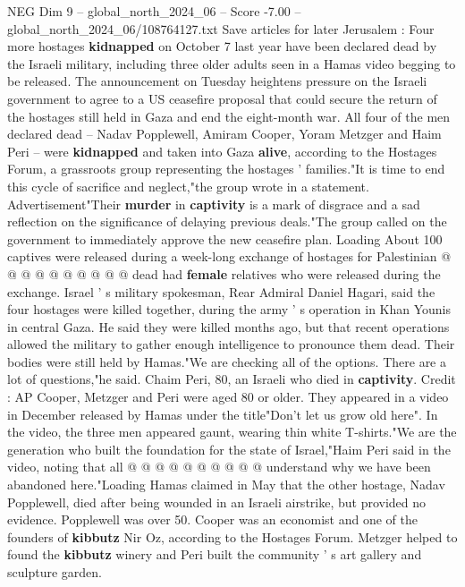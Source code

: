 \begin{textsample}{NEG Dim 9 – global\_north\_2024\_06 – Score -7.00 – global\_north\_2024\_06/108764127.txt}  \label{ex:f9_neg_166}
Save articles for later Jerusalem : Four more hostages \textbf{kidnapped} on October 7 last year have been declared dead by the Israeli military, including three older adults seen in a Hamas video begging to be released.
The announcement on Tuesday heightens pressure on the Israeli government to agree to a US ceasefire proposal that could secure the return of the hostages still held in Gaza and end the eight-month war.
All four of the men declared dead -- Nadav Popplewell, Amiram Cooper, Yoram Metzger and Haim Peri -- were \textbf{kidnapped} and taken into Gaza \textbf{alive}, according to the Hostages Forum, a grassroots group representing the hostages ' families."It is time to end this cycle of sacrifice and neglect,"the group wrote in a statement.
Advertisement"Their \textbf{murder} in \textbf{captivity} is a mark of disgrace and a sad reflection on the significance of delaying previous deals."The group called on the government to immediately approve the new ceasefire plan.
Loading About 100 captives were released during a week-long exchange of hostages for Palestinian @ @ @ @ @ @ @ @ @ @ dead had \textbf{female} relatives who were released during the exchange.
Israel ' s military spokesman, Rear Admiral Daniel Hagari, said the four hostages were killed together, during the army ' s operation in Khan Younis in central Gaza.
He said they were killed months ago, but that recent operations allowed the military to gather enough intelligence to pronounce them dead.
Their bodies were still held by Hamas."We are checking all of the options.
There are a lot of questions,"he said.
Chaim Peri, 80, an Israeli who died in \textbf{captivity}.
Credit : AP Cooper, Metzger and Peri were aged 80 or older.
They appeared in a video in December released by Hamas under the title"Don't let us grow old here".
In the video, the three men appeared gaunt, wearing thin white T-shirts."We are the generation who built the foundation for the state of Israel,"Haim Peri said in the video, noting that all @ @ @ @ @ @ @ @ @ @ understand why we have been abandoned here."Loading Hamas claimed in May that the other hostage, Nadav Popplewell, died after being wounded in an Israeli airstrike, but provided no evidence.
Popplewell was over 50.
Cooper was an economist and one of the founders of \textbf{kibbutz} Nir Oz, according to the Hostages Forum.
Metzger helped to found the \textbf{kibbutz} winery and Peri built the community ' s art gallery and sculpture garden.

\end{textsample}
